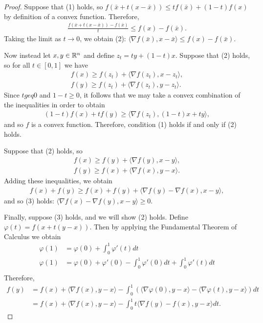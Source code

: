 \begin{proof}
    Suppose that (1) holds, so $f(\bar{x} + t(x - \bar{x})) \leq tf(\bar{x}) + (1 - t)f(x)$ by definition of a convex function. Therefore,
    \begin{align*}
        \frac{f(\bar{x} + t(x - \bar{x})) - f(\bar{x})}{t} \leq f(x) - f(\bar{x}).
    \end{align*}
    Taking the limit as $t \to 0$, we obtain (2): $\langle \nabla f(\bar{x}), x - \bar{x} \rangle \leq f(x) - f(\bar{x})$.

    Now instead let $x, y \in \mathbb{R}^n$ and define $z_t = ty + (1-t)x$. Suppose that (2) holds, so for all $t \in [0, 1]$ we have
    \begin{align*}
        f(x) \geq f(z_t) + \langle \nabla f(z_t), x - z_t\rangle, \\
        f(y) \geq f(z_t) + \langle \nabla f(z_t), y - z_t\rangle.
    \end{align*}
    Since $t geq 0$ and $1-t \geq 0$, it follows that we may take a convex combination of the inequalities in order to obtain
    \begin{align*}
        (1-t)f(x) + tf(y) \geq \langle \nabla f(z_t), (1-t)x + ty \rangle,
    \end{align*}
    and so $f$ is a convex function. Therefore, condition (1) holds if and only if (2) holds.

    Suppose that (2) holds, so
    \begin{align*}
        f(x) \geq f(y) + \langle \nabla f(y), x - y\rangle, \\
        f(y) \geq f(x) + \langle \nabla f(x), y - x\rangle.
    \end{align*}
    Adding these inequalities, we obtain
    \begin{align*}
        f(x) + f(y) \geq f(x) + f(y) + \langle \nabla f(y) - \nabla f(x), x - y \rangle,
    \end{align*}
    and so (3) holds: $\langle \nabla f(x) - \nabla f(y), x - y \rangle \geq 0$.

    Finally, suppose (3) holds, and we will show (2) holds. Define $\varphi(t) = f(x + t(y - x))$. Then by applying the Fundamental Theorem of Calculus we obtain
    \begin{align*}
        \varphi(1) &= \varphi(0) + \int_{0}^{1}\varphi'(t)dt \\
        \varphi(1) &= \varphi(0) + \varphi'(0) - \int_{0}^{1} \varphi'(0)dt + \int_{0}^{1}\varphi'(t)dt \\
    \end{align*}
    Therefore,
    \begin{align*}
        f(y) &= f(x) + \langle \nabla f(x), y - x \rangle - \int_{0}^{1}\left(\langle \nabla \varphi(0), y - x \rangle - \langle \nabla \varphi(t), y - x \rangle\right) dt \\
        &= f(x) + \langle \nabla f(x), y - x \rangle - \int_{0}^{1}t\langle \nabla f(y) - f(x), y - x \rangle dt.
    \end{align*}
\end{proof}

